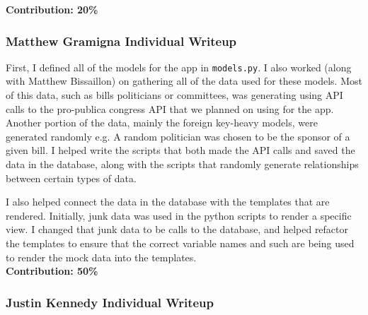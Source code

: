 \documentclass{article}
\newcommand{\n}{\noindent}
\begin{document}
\n\textbf{Contribution: 20\%}
\pagebreak

\subsubsection*{Matthew Gramigna Individual Writeup}

First, I defined all of the models for the app in \verb|models.py|. I also worked (along with Matthew Bissaillon) on gathering all of the data used for these models. Most of this data, such as bills politicians or committees, was generating using API calls to the pro-publica congress API that we planned on using for the app.  Another portion of the data, mainly the foreign key-heavy models, were generated randomly e.g. A random politician was chosen to be the sponsor of a given bill. I helped write the scripts that both made the API calls and saved the data in the database, along with the scripts that randomly generate relationships between certain types of data.

I also helped connect the data in the database with the templates that are rendered. Initially, junk data was used in the python scripts to render a specific view. I changed that junk data to be calls to the database, and helped refactor the templates to ensure that the correct variable names and such are being used to render the mock data into the templates. \\

\n\textbf{Contribution: 50\%} 

\pagebreak

\subsubsection*{Justin Kennedy Individual Writeup}
\end{document}
